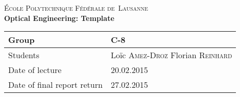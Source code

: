 \begin{titlepage}
\begin{center}
    \textsc{\LARGE École Polytechnique Fédérale de~Lausanne}\\[1.5cm] 
    {\huge \bfseries Optical Engineering: Template}\\[0.4cm] 
    \begin{tabular}{|p{5cm}|p{4cm}|}
        \hline
        Group & C-8 \\ \hline
        Students & Loïc \textsc{Amez-Droz} \newline Florian \textsc{Reinhard} \\ \hline
        Date of lecture & 20.02.2015 \\ \hline
        Date of final report return & 27.02.2015 \\ \hline
    \end{tabular}
\end{center}


\begin{abstract}
    \lipsum[3]
\end{abstract}
 
\vfill
\end{titlepage}
